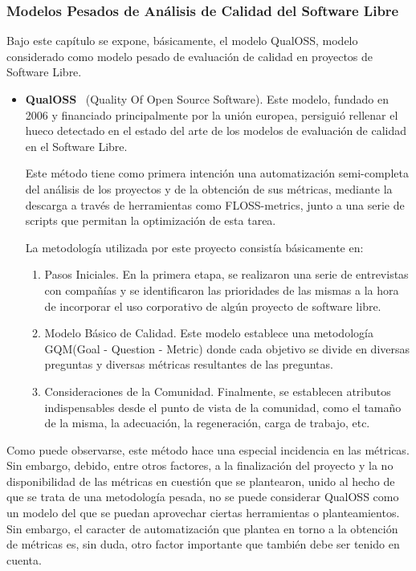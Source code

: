 \documentclass[11pt]{article}
\begin{document}
\subsubsection{Modelos Pesados de Análisis de Calidad del Software Libre}

Bajo este capítulo se expone, básicamente, el modelo QualOSS, modelo considerado como modelo pesado de evaluación de calidad en proyectos de Software Libre.
\begin{itemize}
\item{\textbf{QualOSS}~\cite{qualoss:qualoss} (Quality Of Open Source Software)}. Este modelo, fundado en 2006 y financiado principalmente por la unión europea, persiguió rellenar el hueco detectado en el estado del arte de los modelos de evaluación de calidad en el Software Libre.

Este método tiene como primera intención una automatización semi-completa del análisis de los proyectos y de la obtención de sus métricas, mediante la descarga a través de herramientas como FLOSS-metrics, junto a una serie de scripts que permitan la optimización de esta tarea.

La metodología utilizada por este proyecto consistía básicamente en:
\begin{enumerate}
\item{Pasos Iniciales}. En la primera etapa, se realizaron una serie de entrevistas con compañías y se identificaron las prioridades de las mismas a la hora de incorporar el uso corporativo de algún proyecto de software libre.
\item{Modelo Básico de Calidad}. Este modelo establece una metodología GQM(Goal - Question - Metric) donde cada objetivo se divide en diversas preguntas y diversas métricas resultantes de las preguntas.
\item{Consideraciones de la Comunidad}. Finalmente, se establecen atributos indispensables desde el punto de vista de la comunidad, como el tamaño de la misma, la adecuación, la regeneración, carga de trabajo, etc.
\end{enumerate}
\end{itemize}

Como puede observarse, este método hace una especial incidencia en las métricas. Sin embargo, debido, entre otros factores, a la finalización del proyecto y la no disponibilidad de las métricas en cuestión que se plantearon, unido al hecho de que se trata de una metodología pesada, no se puede considerar QualOSS como un modelo del que se puedan aprovechar ciertas herramientas o planteamientos. Sin embargo, el caracter de automatización que plantea en torno a la obtención de métricas es, sin duda, otro factor importante que también debe ser tenido en cuenta. 
\end{document}
